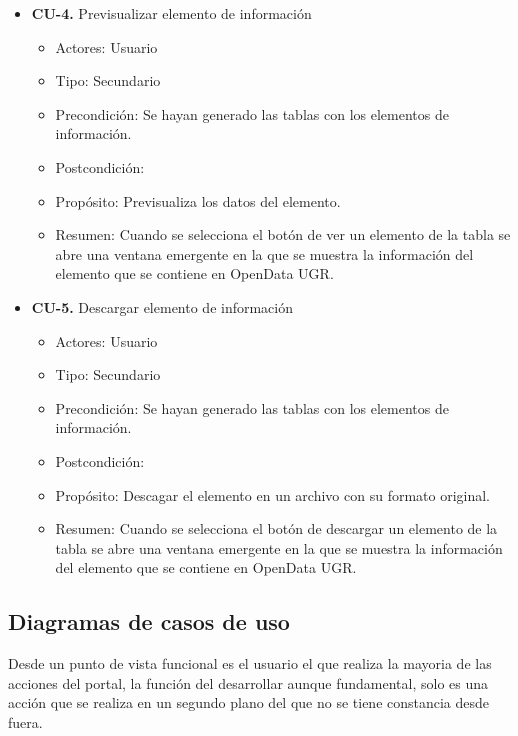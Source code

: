 \begin{itemize}
 \item \textbf{CU-4.} Previsualizar elemento de información
 \begin{itemize}
  \item Actores: Usuario
  \item Tipo: Secundario
  \item Precondición: Se hayan generado las tablas con los elementos de información.
  \item Postcondición: 
  \item Propósito: Previsualiza los datos del elemento.
  \item Resumen: Cuando se selecciona el botón de ver un elemento de la tabla se abre una ventana emergente en la que se 
  muestra la información del elemento que se contiene en OpenData UGR.
 \end{itemize}
\end{itemize}

\newpage
\begin{itemize}
 \item \textbf{CU-5.} Descargar elemento de información
 \begin{itemize}
  \item Actores: Usuario
  \item Tipo: Secundario
  \item Precondición: Se hayan generado las tablas con los elementos de información.
  \item Postcondición: 
  \item Propósito: Descagar el elemento en un archivo con su formato original.
  \item Resumen: Cuando se selecciona el botón de descargar un elemento de la tabla se abre una ventana emergente en la que se
  muestra la información del elemento que se contiene en OpenData UGR.
 \end{itemize}
\end{itemize}

\subsection{Diagramas de casos de uso}

Desde un punto de vista funcional es el usuario el que realiza la mayoria de las acciones del portal, la función del 
desarrollar aunque fundamental, solo es una acción que se realiza en un segundo plano del que no se tiene constancia desde 
fuera.

